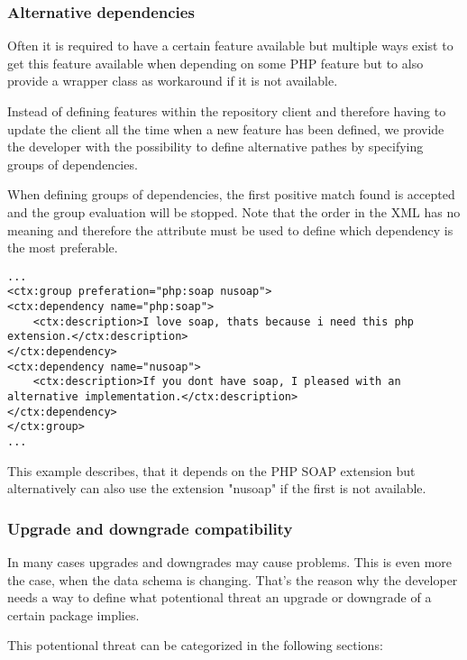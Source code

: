 \subsubsection[sec:alternative dependencies]{Alternative dependencies}
Often it is required to have a certain feature available but multiple ways exist to get this feature available when depending on some PHP feature but to also provide a wrapper class as workaround if it is not available.

Instead of defining features within the repository client and therefore having to update the client all the time when a new feature has been defined, we provide the developer with the possibility to define alternative pathes by specifying groups of dependencies.

When defining groups of dependencies, the first positive match found is accepted and the group evaluation will be stopped. Note that the order in the XML has no meaning and therefore the attribute  must be used to define which dependency is the most preferable.

\lstset{language=XML} 
\begin{lstlisting}[caption=XML example: alternative relationships]
...
<ctx:group preferation="php:soap nusoap">
<ctx:dependency name="php:soap">
    <ctx:description>I love soap, thats because i need this php extension.</ctx:description>
</ctx:dependency>
<ctx:dependency name="nusoap">
    <ctx:description>If you dont have soap, I pleased with an alternative implementation.</ctx:description>
</ctx:dependency>
</ctx:group>
...
\end{lstlisting}
This example describes, that it depends on the PHP SOAP extension but alternatively can also use the extension "nusoap" if the first is not available.

\subsubsection[sec:upgrade and downgrade compatibility]{Upgrade and downgrade compatibility}
In many cases upgrades and downgrades may cause problems. This is even more the case, when the data schema is changing.
That's the reason why the developer needs a way to define what potentional threat an upgrade or downgrade of a certain package implies.

This potentional threat can be categorized in the following sections:

